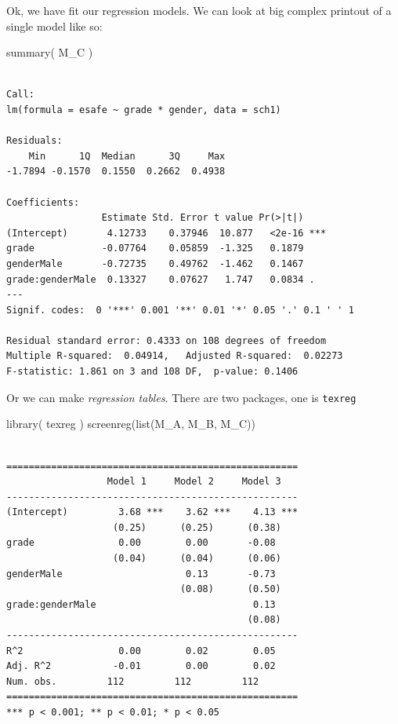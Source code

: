 \documentclass[
  letterpaper,
  DIV=11,
  numbers=noendperiod]{scrreprt}
\newenvironment{Shaded}{\begin{snugshade}}{\end{snugshade}}
\newcommand{\FunctionTok}[1]{\textcolor[rgb]{0.02,0.16,0.49}{#1}}
\newcommand{\NormalTok}[1]{\textcolor[rgb]{0.00,0.44,0.13}{#1}}
\begin{document}
Ok, we have fit our regression models. We can look at big complex
printout of a single model like so:

\begin{Shaded}
\begin{Highlighting}[]
\FunctionTok{summary}\NormalTok{( M\_C )}
\end{Highlighting}
\end{Shaded}

\begin{verbatim}

Call:
lm(formula = esafe ~ grade * gender, data = sch1)

Residuals:
    Min      1Q  Median      3Q     Max 
-1.7894 -0.1570  0.1550  0.2662  0.4938 

Coefficients:
                 Estimate Std. Error t value Pr(>|t|)    
(Intercept)       4.12733    0.37946  10.877   <2e-16 ***
grade            -0.07764    0.05859  -1.325   0.1879    
genderMale       -0.72735    0.49762  -1.462   0.1467    
grade:genderMale  0.13327    0.07627   1.747   0.0834 .  
---
Signif. codes:  0 '***' 0.001 '**' 0.01 '*' 0.05 '.' 0.1 ' ' 1

Residual standard error: 0.4333 on 108 degrees of freedom
Multiple R-squared:  0.04914,   Adjusted R-squared:  0.02273 
F-statistic: 1.861 on 3 and 108 DF,  p-value: 0.1406
\end{verbatim}

Or we can make \emph{regression tables}. There are two packages, one is
\texttt{texreg}

\begin{Shaded}
\begin{Highlighting}[]
\FunctionTok{library}\NormalTok{( texreg )}
\FunctionTok{screenreg}\NormalTok{(}\FunctionTok{list}\NormalTok{(M\_A, M\_B, M\_C))}
\end{Highlighting}
\end{Shaded}

\begin{verbatim}

====================================================
                  Model 1     Model 2     Model 3   
----------------------------------------------------
(Intercept)         3.68 ***    3.62 ***    4.13 ***
                   (0.25)      (0.25)      (0.38)   
grade               0.00        0.00       -0.08    
                   (0.04)      (0.04)      (0.06)   
genderMale                      0.13       -0.73    
                               (0.08)      (0.50)   
grade:genderMale                            0.13    
                                           (0.08)   
----------------------------------------------------
R^2                 0.00        0.02        0.05    
Adj. R^2           -0.01        0.00        0.02    
Num. obs.         112         112         112       
====================================================
*** p < 0.001; ** p < 0.01; * p < 0.05
\end{verbatim}
\end{document}
